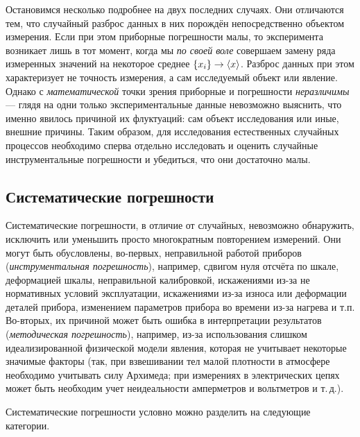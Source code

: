 Остановимся несколько подробнее на двух последних случаях. Они отличаются
тем, что случайный разброс данных в них порождён непосредственно объектом
измерения. Если при этом приборные погрешности малы, то 
эксперимента возникает лишь в тот момент, когда мы \emph{по своей
воле} совершаем замену ряда измеренных значений на некоторое среднее
$\left\{ x_{i}\right\} \to\left<x\right>$. Разброс данных при этом
характеризует не точность измерения, а сам исследуемый объект или
явление. Однако с \emph{математической} точки зрения приборные и
погрешности \emph{неразличимы} --- глядя на одни только
экспериментальные данные невозможно выяснить, что именно явилось причиной
их флуктуаций: сам объект исследования или иные, внешние причины.
Таким образом, для исследования естественных случайных процессов необходимо
сперва отдельно исследовать и оценить случайные инструментальные погрешности
и убедиться, что они достаточно малы.


\subsection{Систематические погрешности}

Систематические погрешности, в отличие от случайных, невозможно обнаружить,
исключить или уменьшить просто многократным повторением измерений.
Они могут быть обусловлены, во-первых, неправильной работой приборов
(\emph{инструментальная погрешность}), например, сдвигом нуля отсчёта
по шкале, деформацией шкалы, неправильной калибровкой, искажениями
из-за не нормативных условий эксплуатации, искажениями из-за износа
или деформации деталей прибора, изменением параметров прибора во времени
из-за нагрева и т.п. Во-вторых, их причиной может быть ошибка в интерпретации
результатов (\emph{методическая погрешность}), например, из-за использования
слишком идеализированной физической модели явления, которая не учитывает
некоторые значимые факторы (так, при взвешивании тел малой плотности
в атмосфере необходимо учитывать силу Архимеда; при измерениях в электрических
цепях может быть необходим учет неидеальности амперметров и вольтметров
и т.\,д.).

Систематические погрешности условно можно разделить на следующие категории.

